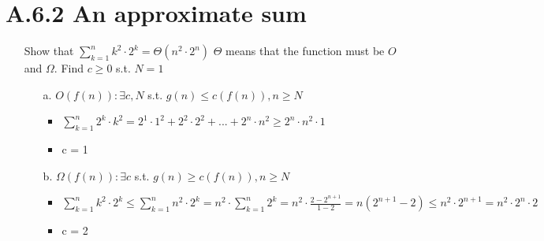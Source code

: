 \documentclass[12pt]{article}
\begin{document}
\section*{A.6.2 An approximate sum}
\begin{enumerate}
  \item[] Show that $\sum_{k=1}^{n}k^2\cdot2^k = \Theta(n^2\cdot2^n)$
    $\Theta$ means that the function must be $O$ and $\Omega$.
    Find $c \geq 0$ s.t. $N = 1$
    \begin{enumerate}
      \item[a.] $O(f(n)): \exists c,N$ s.t. $g(n) \leq c(f(n)), n \geq N$
        \begin{itemize}
          \item $\sum_{k=1}^{n}2^k\cdot k^2 = 2^1\cdot1^2 + 2^2\cdot2^2 + ... + 2^n\cdot n^2 \geq 2^n\cdot n^2\cdot1$
          \item c = 1
        \end{itemize}
      \item[b.] $\Omega(f(n)): \exists c$ s.t. $g(n) \geq c(f(n)), n\geq N$
        \begin{itemize}
          \item $\sum_{k=1}^{n}k^2\cdot2^k \leq \sum_{k=1}^{n}n^2\cdot2^k = n^2 \cdot \sum_{k=1}^{n}2^k = n^2 \cdot \frac{2-2^{n+1}}{1-2} = n(2^{n+1} -2) \leq n^2\cdot2^{n+1} = n^2\cdot2^n\cdot2$
          \item c = 2
        \end{itemize}
    \end{enumerate}

\end{enumerate}
\end{document}
